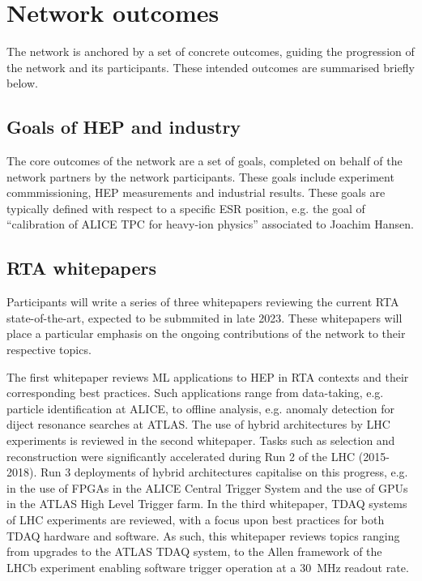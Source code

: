 \section{Network outcomes}
\label{outcomes}
The network is anchored by a set of concrete outcomes, guiding the progression of the network and its participants. These intended outcomes are summarised briefly below.

\subsection{Goals of HEP and industry}
\label{goals}
The core outcomes of the network are a set of goals, completed on behalf of the network partners by the network participants.  These goals include experiment commmissioning, HEP measurements and industrial results. These goals are typically defined with respect to a specific ESR position, e.g. the goal of ``calibration of ALICE TPC for heavy-ion physics'' associated to Joachim Hansen.

\subsection{RTA whitepapers}
\label{whitepapers}
Participants will write a series of three whitepapers reviewing the current RTA state-of-the-art, expected to be submmited in late 2023. These whitepapers will place a particular emphasis on the ongoing contributions of the network to their respective topics. \par

The first whitepaper reviews ML applications to HEP in RTA contexts and their corresponding best practices. Such applications range from data-taking, e.g. particle identification at ALICE, to offline analysis, e.g. anomaly detection for diject resonance searches at ATLAS. \cite{ALICE-PID, ATLAS-dijet} The use of hybrid architectures by LHC experiments is reviewed in the second whitepaper. Tasks such as selection and reconstruction were significantly accelerated during Run 2 of the LHC (2015-2018). Run 3 deployments of hybrid architectures capitalise on this progress, e.g. in the use of FPGAs in the ALICE Central Trigger System and the use of GPUs in the ATLAS High Level Trigger farm. \cite{ALICE-CTS, CMS-HLT-farm} In the third whitepaper, TDAQ systems of LHC experiments are reviewed, with a focus upon best practices for both TDAQ hardware and software. As such, this whitepaper reviews topics ranging from upgrades to the ATLAS TDAQ system, to the Allen framework of the LHCb experiment enabling software trigger operation at a 30~MHz readout rate. \cite{ATLAS-TDAQ, LHCb-Allen}

